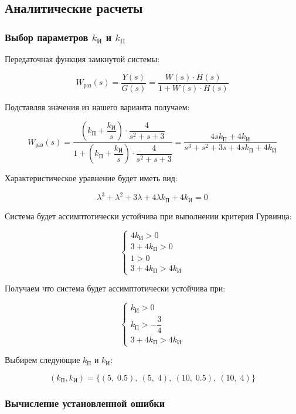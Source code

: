 \documentclass[a5paper, 10pt]{article}
\theoremstyle{definition}
\theoremstyle{plain}
\theoremstyle{remark}
\begin{document}
\subsection{Аналитические расчеты}

\subsubsection{Выбор параметров $k_{\text{И}}$ и $k_{\text{П}}$}

Передаточная функция замкнутой системы:

$$
W_{\text{раз}}(s)=\dfrac{Y(s)}{G(s)}= \dfrac{W(s)\cdot H(s)}{1+W(s)\cdot H(s)}
$$

Подставляя значения из нашего варианта получаем:

$$
W_{\text{раз}}(s)=\dfrac{\left(k_{\text{П}}+\dfrac{k_{\text{И}}}{s}\right)\cdot \dfrac{4}{s^2+s+3}}{1+\left(k_{\text{П}}+\dfrac{k_{\text{И}}}{s}\right)\cdot \dfrac{4}{s^2+s+3}}=\dfrac{4sk_{\text{П}}+4k_{\text{И}}}{s^3+s^2+3s+4sk_{\text{П}}+4k_{\text{И}}}
$$

Характеристическое уравнение будет иметь вид:

$$
\lambda^3+\lambda^2+3\lambda+4\lambda k_{\text{П}}+4k_{\text{И}}=0
$$

Система будет ассимптотически устойчива при выполнении критерия Гурвинца:

$$
\begin{cases}
    4k_{\text{И}}>0\\
    3+4k_{\text{П}}>0\\
    1>0\\
    3+4k_{\text{П}}>4k_{\text{И}}
\end{cases}
$$

Получаем что система будет ассимптотически устойчива при:

$$
\begin{cases}
    k_{\text{И}}>0\\
    k_{\text{П}}>-\dfrac{3}{4}\\
    3+4k_{\text{П}}>4k_{\text{И}}
\end{cases}
$$

Выбирем следующие $k_{\text{П}}$ и $k_{\text{И}}$:

$$
(k_{\text{П}}, k_{\text{И}}) =\{(5,\; 0.5), \
(5,\; 4), \
(10,\; 0.5), \
(10,\; 4)\}
$$

\subsubsection{Вычисление установленной ошибки}
\end{document}

